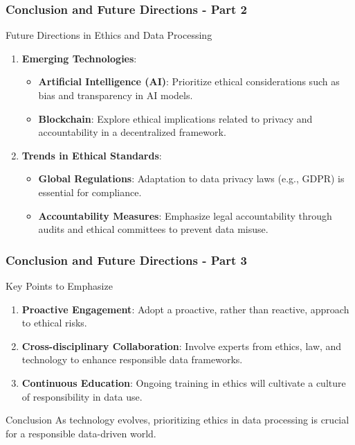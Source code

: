 \documentclass[aspectratio=169]{beamer}
\begin{document}
\begin{frame}[fragile]
  \frametitle{Conclusion and Future Directions - Part 2}
  
  \begin{block}{Future Directions in Ethics and Data Processing}
    \begin{enumerate}
      \item \textbf{Emerging Technologies}:
      \begin{itemize}
        \item \textbf{Artificial Intelligence (AI)}: Prioritize ethical considerations such as bias and transparency in AI models.
        \item \textbf{Blockchain}: Explore ethical implications related to privacy and accountability in a decentralized framework.
      \end{itemize}
      
      \item \textbf{Trends in Ethical Standards}:
      \begin{itemize}
        \item \textbf{Global Regulations}: Adaptation to data privacy laws (e.g., GDPR) is essential for compliance.
        \item \textbf{Accountability Measures}: Emphasize legal accountability through audits and ethical committees to prevent data misuse.
      \end{itemize}
    \end{enumerate}
  \end{block}
  
\end{frame}

\begin{frame}[fragile]
  \frametitle{Conclusion and Future Directions - Part 3}
  
  \begin{block}{Key Points to Emphasize}
    \begin{enumerate}
      \item \textbf{Proactive Engagement}: Adopt a proactive, rather than reactive, approach to ethical risks.
      \item \textbf{Cross-disciplinary Collaboration}: Involve experts from ethics, law, and technology to enhance responsible data frameworks.
      \item \textbf{Continuous Education}: Ongoing training in ethics will cultivate a culture of responsibility in data use.
    \end{enumerate}
  \end{block}
  
  \begin{block}{Conclusion}
    As technology evolves, prioritizing ethics in data processing is crucial for a responsible data-driven world.
  \end{block}
  
\end{frame}
\end{document}
